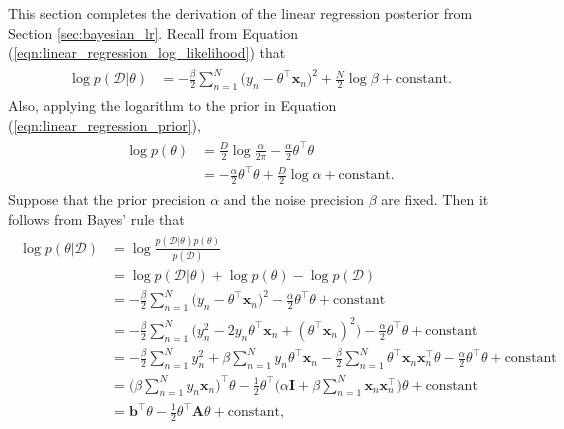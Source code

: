 \documentclass[msc,deptreport.inf]{infthesis} %
\newcommand{\matr}[1]{\mathbf{#1}}
\begin{document}
This section completes the derivation of the linear regression posterior from Section \ref{sec:bayesian_lr}. Recall from Equation (\ref{eqn:linear_regression_log_likelihood}) that
\begin{align}
\begin{split}
	\log p(\mathcal{D} | \theta) 
	& = - \frac{\beta}{2} \sum_{n=1}^N \big(y_n - \theta^\intercal \matr{x}_n \big)^2 
	+ \frac{N}{2} \log \beta
	+ \text{constant}.
\end{split}
\end{align}
Also, applying the logarithm to the prior in Equation (\ref{eqn:linear_regression_prior}),
\begin{align}
\begin{split}
	\log p(\theta) 
	& = \frac{D}{2} \log \frac{\alpha}{2\pi} - \frac{\alpha}{2} \theta^\intercal \theta \\
	& = -\frac{\alpha}{2} \theta^\intercal \theta + \frac{D}{2} \log \alpha + \text{constant}.
\end{split}
\end{align}
Suppose that the prior precision $\alpha$ and the noise precision $\beta$ are fixed. Then it follows from Bayes' rule that
\begin{align}\label{eqn:linear_regression_log_posterior}
\begin{split}
	\log p(\theta | \mathcal{D}) 
	& = \log \frac{p(\mathcal{D} | \theta) p(\theta)}{p(\mathcal{D})} \\
	& = \log p(\mathcal{D} | \theta) + \log p(\theta) - \log p(\mathcal{D}) \\
	& = -\frac{\beta}{2} \sum_{n=1}^N \big(y_n - \theta^\intercal \matr{x}_n \big)^2 
	-\frac{\alpha}{2} \theta^\intercal \theta 
	+ \text{constant} \\
	& = -\frac{\beta}{2} \sum_{n=1}^N\big( y_n^2 - 2 y_n \theta^\intercal \matr{x}_n + (\theta^\intercal \matr{x}_n)^2 \big)
	-\frac{\alpha}{2} \theta^\intercal \theta
	+ \text{constant} \\
	& = -\frac{\beta}{2} \sum_{n=1}^N y_n^2
	+ \beta \sum_{n=1}^N y_n \theta^\intercal \matr{x}_n
	-\frac{\beta}{2} \sum_{n=1}^N \theta^\intercal \matr{x}_n \matr{x}_n^\intercal \theta
	-\frac{\alpha}{2} \theta^\intercal \theta
	+ \text{constant} \\
	& = \Big(\beta \sum_{n=1}^N y_n \matr{x}_n \Big)^\intercal \theta 
	-\frac{1}{2} \theta^\intercal \Big( \alpha \matr{I} + \beta \sum_{n=1}^N \matr{x}_n \matr{x}_n^\intercal \Big) \theta 
	+ \text{constant} \\
	& = \matr{b}^\intercal \theta 
	- \frac{1}{2} \theta^\intercal \matr{A} \theta 
	+ \text{constant},
\end{split}
\end{align}
\end{document}
